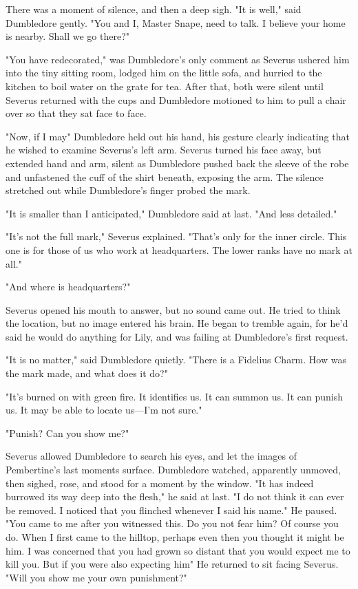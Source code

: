 There was a moment of silence, and then a deep sigh. "It is well," said Dumbledore gently. "You and I, Master Snape, need to talk. I believe your home is nearby. Shall we go there?"

\sbreak

"You have redecorated," was Dumbledore's only comment as Severus ushered him into the tiny sitting room, lodged him on the little sofa, and hurried to the kitchen to boil water on the grate for tea. After that, both were silent until Severus returned with the cups and Dumbledore motioned to him to pull a chair over so that they sat face to face.

"Now, if I may{\el}" Dumbledore held out his hand, his gesture clearly indicating that he wished to examine Severus's left arm. Severus turned his face away, but extended hand and arm, silent as Dumbledore pushed back the sleeve of the robe and unfastened the cuff of the shirt beneath, exposing the arm. The silence stretched out while Dumbledore's finger probed the mark.

"It is smaller than I anticipated," Dumbledore said at last. "And less detailed."

"It's not the full mark," Severus explained. "That's only for the inner circle. This one is for those of us who work at headquarters. The lower ranks have no mark at all."

"And where is headquarters?"

Severus opened his mouth to answer, but no sound came out. He tried to think the location, but no image entered his brain. He began to tremble again, for he'd said he would do anything for Lily, and was failing at Dumbledore's first request.

"It is no matter," said Dumbledore quietly. "There is a Fidelius Charm. How was the mark made, and what does it do?"

"It's burned on with green fire. It identifies us. It can summon us. It can punish us. It may be able to locate us—I'm not sure."

"Punish? Can you show me?"

Severus allowed Dumbledore to search his eyes, and let the images of Pembertine's last moments surface. Dumbledore watched, apparently unmoved, then sighed, rose, and stood for a moment by the window. "It has indeed burrowed its way deep into the flesh," he said at last. "I do not think it can ever be removed. I noticed that you flinched whenever I said{\el} his name." He paused. "You came to me after you witnessed this. Do you not fear him? Of course you do. When I first came to the hilltop, perhaps even then you thought it might be him. I was concerned that you had grown so distant that you would expect me to kill you. But if you were also expecting him{\el}" He returned to sit facing Severus. "Will you show me your own punishment?"

